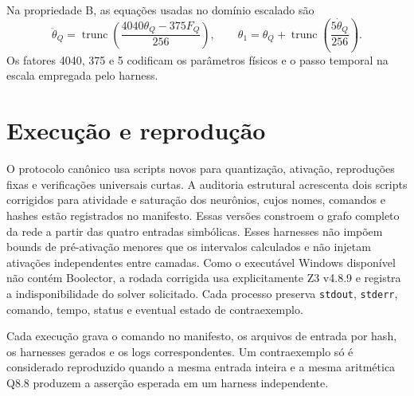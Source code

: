 Na propriedade B, as equações usadas no domínio escalado são
\[
  \ddot{\theta}_Q=\operatorname{trunc}\!\left(
  \frac{4040\theta_Q-375F_Q}{256}\right),\qquad
  \theta_1=\theta_Q+\operatorname{trunc}\!\left(\frac{5\dot{\theta}_Q}{256}\right).
\]
Os fatores 4040, 375 e 5 codificam os parâmetros físicos e o passo temporal na
escala empregada pelo harness.

\section{Execução e reprodução}

O protocolo canônico usa scripts novos para quantização, ativação, reproduções
fixas e verificações universais curtas. A auditoria estrutural acrescenta dois
scripts corrigidos para atividade e saturação dos neurônios, cujos nomes,
comandos e hashes estão registrados no manifesto. Essas versões
constroem o grafo completo da rede a partir das quatro entradas simbólicas.
Esses harnesses não impõem bounds de pré-ativação menores que os intervalos
calculados e não injetam ativações independentes entre camadas. Como o
executável Windows disponível não contém Boolector, a rodada corrigida usa
explicitamente Z3 v4.8.9 e registra a indisponibilidade do solver solicitado.
Cada processo preserva \texttt{stdout}, \texttt{stderr}, comando, tempo,
status e eventual estado de contraexemplo.

Cada execução grava o comando no manifesto, os arquivos de entrada por hash,
os harnesses gerados e os logs correspondentes. Um contraexemplo só é
considerado reproduzido quando a mesma entrada inteira e a mesma aritmética Q8.8
produzem a asserção esperada em um harness independente.

